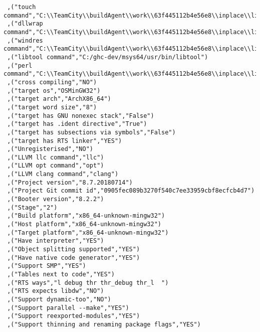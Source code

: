 \begin{verbatim}
 ,("touch command","C:\\TeamCity\\buildAgent\\work\\63f445112b4e56e8\\inplace\\lib/bin/touchy.exe")
 ,("dllwrap command","C:\\TeamCity\\buildAgent\\work\\63f445112b4e56e8\\inplace\\lib\\../mingw/bin/dllwrap.exe")
 ,("windres command","C:\\TeamCity\\buildAgent\\work\\63f445112b4e56e8\\inplace\\lib\\../mingw/bin/windres.exe")
 ,("libtool command","C:/ghc-dev/msys64/usr/bin/libtool")
 ,("perl command","C:\\TeamCity\\buildAgent\\work\\63f445112b4e56e8\\inplace\\lib\\../perl/perl.exe")
 ,("cross compiling","NO")
 ,("target os","OSMinGW32")
 ,("target arch","ArchX86_64")
 ,("target word size","8")
 ,("target has GNU nonexec stack","False")
 ,("target has .ident directive","True")
 ,("target has subsections via symbols","False")
 ,("target has RTS linker","YES")
 ,("Unregisterised","NO")
 ,("LLVM llc command","llc")
 ,("LLVM opt command","opt")
 ,("LLVM clang command","clang")
 ,("Project version","8.7.20180714")
 ,("Project Git commit id","0905fec089b3270f540c7ee33959cbf8ecfcb4d7")
 ,("Booter version","8.2.2")
 ,("Stage","2")
 ,("Build platform","x86_64-unknown-mingw32")
 ,("Host platform","x86_64-unknown-mingw32")
 ,("Target platform","x86_64-unknown-mingw32")
 ,("Have interpreter","YES")
 ,("Object splitting supported","YES")
 ,("Have native code generator","YES")
 ,("Support SMP","YES")
 ,("Tables next to code","YES")
 ,("RTS ways","l debug thr thr_debug thr_l  ")
 ,("RTS expects libdw","NO")
 ,("Support dynamic-too","NO")
 ,("Support parallel --make","YES")
 ,("Support reexported-modules","YES")
 ,("Support thinning and renaming package flags","YES")

\end{verbatim}
